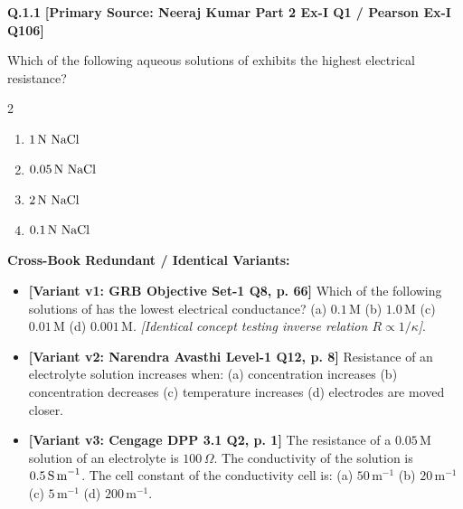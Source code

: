 \begin{problembox}
\textbf{Q.1.1} \hfill \textbf{[Primary Source: Neeraj Kumar Part 2 Ex-I Q1 / Pearson Ex-I Q106]}
\label{q:qb-c1-01}

Which of the following aqueous solutions of  exhibits the highest electrical resistance?
\begin{multicols}{2}
\begin{enumerate}[label=(\alph*)]
    \item $1\,\text{N } \ce{NaCl}$
    \item $0.05\,\text{N } \ce{NaCl}$
    \item $2\,\text{N } \ce{NaCl}$
    \item $0.1\,\text{N } \ce{NaCl}$
\end{enumerate}
\end{multicols}

\tcbline
\textbf{\color{accentamber}Cross-Book Redundant / Identical Variants:}
\begin{itemize}[leftmargin=*,itemsep=2pt]
    \item \textbf{[Variant v1: GRB Objective Set-1 Q8, p. 66]} Which of the following solutions of  has the lowest electrical conductance? (a) $0.1\,\text{M}$ (b) $1.0\,\text{M}$ (c) $0.01\,\text{M}$ (d) $0.001\,\text{M}$. \textit{[Identical concept testing inverse relation $R \propto 1/\kappa$]}.
    \item \textbf{[Variant v2: Narendra Avasthi Level-1 Q12, p. 8]} Resistance of an electrolyte solution increases when: (a) concentration increases (b) concentration decreases (c) temperature increases (d) electrodes are moved closer.
    \item \textbf{[Variant v3: Cengage DPP 3.1 Q2, p. 1]} The resistance of a $0.05\,\text{M}$ solution of an electrolyte is $100\,\Omega$. The conductivity of the solution is $0.5\,\text{S\,m}^{-1}$. The cell constant of the conductivity cell is: (a) $50\,\text{m}^{-1}$ (b) $20\,\text{m}^{-1}$ (c) $5\,\text{m}^{-1}$ (d) $200\,\text{m}^{-1}$.
\end{itemize}
\end{problembox}

